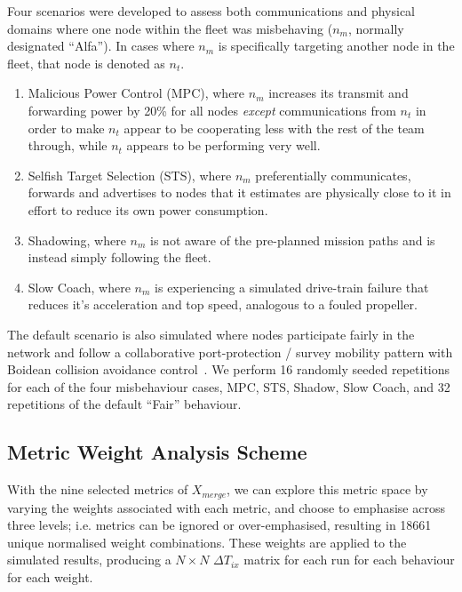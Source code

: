 \documentclass[conference]{IEEEtran}
\begin{document}
Four scenarios were developed to assess both communications and physical domains where one node within the fleet was misbehaving ($n_m$, normally designated ``Alfa''). In cases where $n_m$ is specifically targeting another node in the fleet, that node is denoted as $n_t$.

\begin{enumerate}
	\item Malicious Power Control (MPC), where $n_m$ increases its transmit and forwarding power by 20\% for all nodes \emph{except} communications from $n_t$ in order to make $n_t$ appear to be cooperating less with the rest of the team through, while $n_t$ appears to be performing very well.
	\item Selfish Target Selection (STS), where $n_m$ preferentially communicates, forwards and advertises to nodes that it estimates are physically close to it in effort to reduce its own power consumption.
	\item Shadowing, where $n_m$ is not aware of the pre-planned mission paths and is instead simply following the fleet.
	\item Slow Coach, where $n_m$ is experiencing a simulated drive-train failure that reduces it's acceleration and top speed, analogous to a fouled propeller. 
\end{enumerate}

The default scenario is also simulated where nodes participate fairly in the network and follow a collaborative port-protection / survey mobility pattern with Boidean collision avoidance control~\cite{Reynolds1987a}.
We perform 16 randomly seeded repetitions for each of the four misbehaviour cases, MPC, STS, Shadow, Slow Coach, and 32 repetitions of the default ``Fair'' behaviour.



\subsection{Metric Weight Analysis Scheme}

With the nine selected metrics of $X_{merge}$, we can explore this metric space by varying the weights associated with each metric, and choose to emphasise across three levels; i.e. metrics can be ignored or over-emphasised, resulting in 18661 unique normalised weight combinations.
These weights are applied to the simulated results, producing a $N\times N$ $\Delta T_{ix}$ matrix for each run for each behaviour for each weight.
\end{document}

